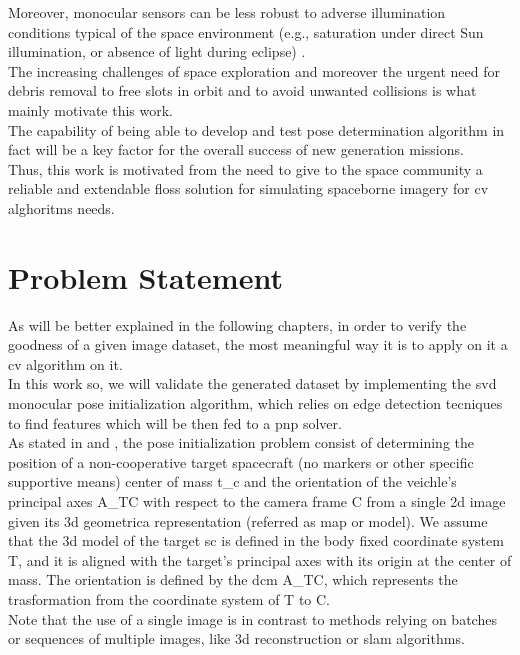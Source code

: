 Moreover, monocular sensors can be less robust to adverse illumination conditions typical of the space environment \cite{Volpe2017} (e.g., saturation under direct Sun illumination, or absence of light during eclipse) \cite{pesciolino}.\\
The increasing challenges of space exploration and moreover the urgent need for debris removal to free slots in orbit and to avoid unwanted collisions is what mainly motivate this work.\\
The capability of being able to develop and test pose determination algorithm in fact will be a key factor for the overall success of new generation missions.\\
Thus, this work is motivated from the need to give to the space community a reliable and extendable \acrfull{floss} solution for simulating spaceborne imagery for \acrfull{cv} alghoritms needs.\\

\section{Problem Statement}
As will be better explained in the following chapters, in order to verify the goodness of a given image dataset, the most meaningful way it is to apply on it a \acrshort{cv} algorithm on it.\\
In this work so, we will validate the generated dataset by implementing the \acrfull{svd} monocular pose initialization algorithm, which relies on edge detection tecniques to find features which will be then fed to a \acrfull{pnp} solver.\\
As stated in \cite{D2014} and \cite{Sharma2018}, the pose initialization problem consist of determining the position of a non-cooperative target spacecraft (no markers or other specific supportive means) center of mass \gls{t_c} and the orientation of the veichle's principal axes \gls{A_TC} with respect to the camera frame C from a single \acrfull{2d} image given its \acrfull{3d} geometrica representation (referred as map or model).
We assume that the \acrshort{3d} model of the target \acrshort{sc} is defined in the body fixed coordinate system T, and it is aligned with the target's principal axes with its origin at the center of mass. The orientation is defined by the \acrfull{dcm} \gls{A_TC}, which represents the trasformation from the coordinate system of T to C.\\
Note that the use of a single image is in contrast to methods relying on batches or sequences of multiple images, like \acrshort{3d} reconstruction or \acrfull{slam} algorithms.\\

